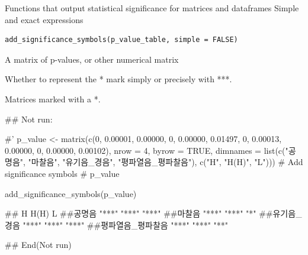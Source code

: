 \documentclass[a4paper]{book}
\begin{document}
%
\begin{Description}
Functions that output statistical significance for matrices and dataframes Simple and exact expressions
\end{Description}
%
\begin{Usage}
\begin{verbatim}
add_significance_symbols(p_value_table, simple = FALSE)
\end{verbatim}
\end{Usage}
%
\begin{Arguments}
\begin{ldescription}
\item[\code{p\_value\_table}] A matrix of p-values, or other numerical matrix

\item[\code{simple}] Whether to represent the * mark simply or precisely with ***.
\end{ldescription}
\end{Arguments}
%
\begin{Value}
Matrices marked with a *.
\end{Value}
%
\begin{Examples}
\begin{ExampleCode}

 \#\# Not run: 

 #' p_value <- matrix(c(0, 0.00001, 0.00000,
                    0, 0.00000, 0.01497,
                    0, 0.00013, 0.00000,
                    0, 0.00000, 0.00102),
                  nrow = 4, byrow = TRUE,
                  dimnames = list(c("공명음", "마찰음", "유기음_경음", "평파열음_평파찰음"),
                                  c("H", "H(H)", "L")))
     # Add significance symbols
     # p_value

     add_significance_symbols(p_value)

 ##                  H     H(H)  L
 ##공명음            "***" "***" "***"
 ##마찰음            "***" "***" "*"
 ##유기음_경음       "***" "***" "***"
 ##평파열음_평파찰음 "***" "***" "**"




 
## End(Not run)


\end{ExampleCode}
\end{Examples}
\end{document}
